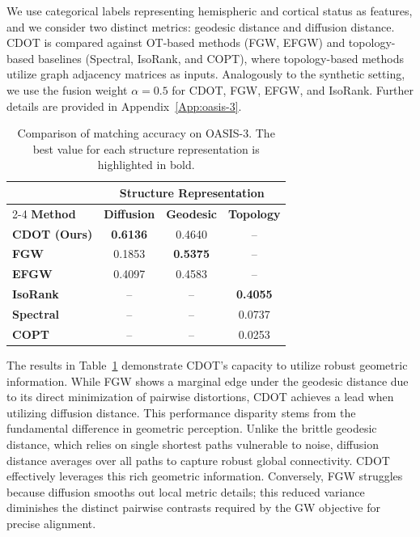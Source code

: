 \documentclass{article}
\theoremstyle{plain}
\theoremstyle{definition}
\theoremstyle{remark}
\begin{document}
We use categorical labels representing hemispheric and cortical status as features, and we consider two distinct metrics: geodesic distance and diffusion distance. CDOT is compared against OT-based methods (FGW, EFGW) and topology-based baselines (Spectral, IsoRank, and COPT), where topology-based methods utilize graph adjacency matrices as inputs. Analogously to the synthetic setting, we use the fusion weight $\alpha=0.5$ for CDOT, FGW, EFGW, and IsoRank. Further details are provided in Appendix~\ref{App:oasis-3}.

\begin{table}[t]
	\centering
	\setlength{\tabcolsep}{9.6pt}
	\caption{Comparison of matching accuracy on OASIS-3. The best value for each structure representation is highlighted in bold.}
	\label{tab:oasis-accuracy}
	\footnotesize
	\renewcommand{\arraystretch}{1.2}
	\begin{tabular}{lccc}
		\toprule
		& \multicolumn{3}{c}{\textbf{Structure Representation}} \\
		\cmidrule(lr){2-4}
		\textbf{Method} & \textbf{Diffusion} & \textbf{Geodesic} & \textbf{Topology} \\
		\midrule
		\textbf{CDOT (Ours)} & \textbf{0.6136} & 0.4640 & -- \\
		\textbf{FGW} & 0.1853 & \textbf{0.5375} & -- \\
		\textbf{EFGW} & 0.4097 & 0.4583 & -- \\
		\textbf{IsoRank} & -- & -- & \textbf{0.4055} \\
		\textbf{Spectral} & -- & -- & 0.0737 \\
		\textbf{COPT} & -- & -- & 0.0253 \\
		\bottomrule
	\end{tabular}\vspace{-5mm}
\end{table}

The results in Table~\ref{tab:oasis-accuracy} demonstrate CDOT's capacity to utilize robust geometric information. While FGW shows a marginal edge under the geodesic distance due to its direct minimization of pairwise distortions, CDOT achieves a lead when utilizing diffusion distance. This performance disparity stems from the fundamental difference in geometric perception. Unlike the brittle geodesic distance, which relies on single shortest paths vulnerable to noise, diffusion distance averages over all paths to capture robust global connectivity. CDOT effectively leverages this rich geometric information. Conversely, FGW struggles because diffusion smooths out local metric details; this reduced variance diminishes the distinct pairwise contrasts required by the GW objective for precise alignment.
\end{document}
